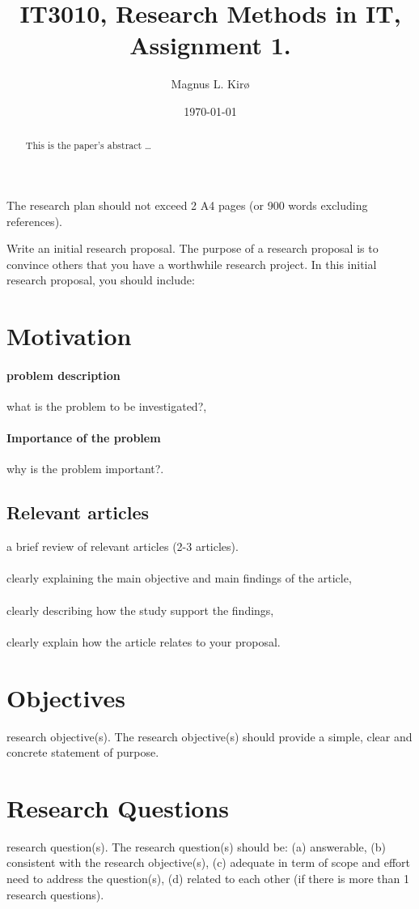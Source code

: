 \documentclass[12pt, a4paper]{article}
\title{
	IT3010, Research Methods in IT, Assignment 1. 
}
\author{
	Magnus L. Kirø \\
}
\date{\today}
\begin{document}
\maketitle
{}

\begin{abstract}
This is the paper's abstract \ldots
\end{abstract}
The research plan should not exceed 2 A4 pages (or 900 words excluding
references).

Write an initial research proposal. The purpose of a research proposal is to
convince others that you have a worthwhile research project. In this initial
research proposal, you should include:

\section{Motivation}

\paragraph{problem description}
what is
the problem to be investigated?, 

\paragraph{Importance of the problem}
why is the problem important?.

\subsection{Relevant articles}
    a brief review of relevant articles (2-3 articles). 
\paragraph{}
clearly
explaining the main objective and main findings of the article, 

\paragraph{}
clearly
describing how the study support the findings, 

\paragraph{}
clearly explain how the
article relates to your proposal.

\section{Objectives}
    research objective(s). The research objective(s) should provide a simple,
clear and concrete statement of purpose.

\section{Research Questions}
    research question(s).  The research question(s) should be: 
(a) answerable,
(b) consistent with the research objective(s), 
(c) adequate in term of scope and effort need to address the question(s), 
(d) related to each other (if there is more than 1 research questions).
\end{document}
